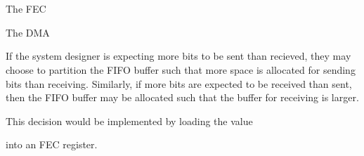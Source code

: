\section{}

The FEC 


The DMA 

If the system designer is expecting more bits to be sent than recieved, they may
choose to partition the FIFO buffer such that more space is allocated for
sending bits than receiving. Similarly, if more bits are expected to be received
than sent, then the FIFO buffer may be allocated such that the buffer for
receiving is larger. 

This decision would be implemented by loading the value


into an FEC register.
